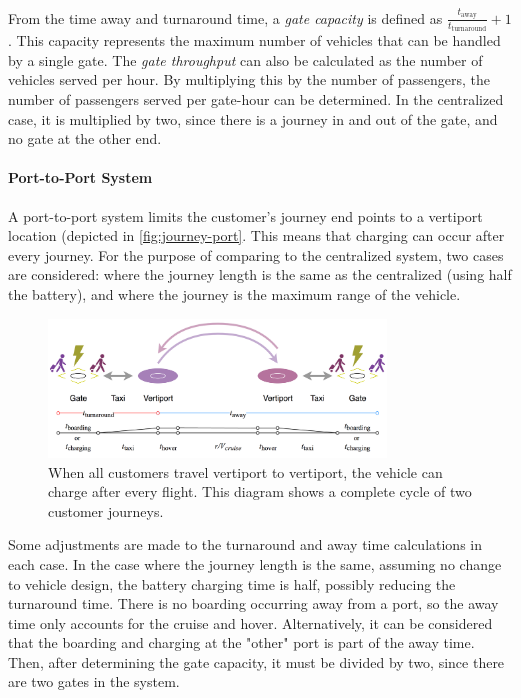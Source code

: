 From the time away and turnaround time, a \textit{gate capacity} is defined as $\frac{t_\text{away}}{t_\text{turnaround}} + 1$. This capacity represents the maximum number of vehicles that can be handled by a single gate. The \textit{gate throughput} can also be calculated as the number of vehicles served per hour. By multiplying this by the number of passengers, the number of passengers served per gate-hour can be determined. In the centralized case, it is multiplied by two, since there is a journey in and out of the gate, and no gate at the other end.

\paragraph{Port-to-Port System}
A port-to-port system limits the customer's journey end points to a vertiport location (depicted in \autoref{fig:journey-port}. This means that charging can occur after every journey. For the purpose of comparing to the centralized system, two cases are considered: where the journey length is the same as the centralized (using half the battery), and where the journey is the maximum range of the vehicle.

\begin{figure}[h]
    \centering
    \includegraphics[width=0.8\textwidth]{Figures/journey-port-port.png}
    \captionsetup{justification=centering}
    \caption{When all customers travel vertiport to vertiport, the vehicle can charge after every flight. This diagram shows a complete cycle of two customer journeys.}
    \label{fig:journey-port}
\end{figure}

Some adjustments are made to the turnaround and away time calculations in each case. In the case where the journey length is the same, assuming no change to vehicle design, the battery charging time is half, possibly reducing the turnaround time. There is no boarding occurring away from a port, so the away time only accounts for the cruise and hover. Alternatively, it can be considered that the boarding and charging at the "other" port is part of the away time. Then, after determining the gate capacity, it must be divided by two, since there are two gates in the system.


